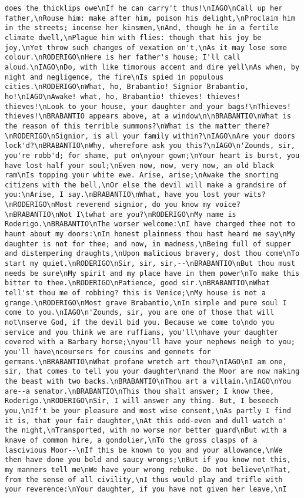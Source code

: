 \begin{verbatim}
does the thicklips owe\nIf he can carry't thus!\nIAGO\nCall up her father,\nRouse him: make after him, poison his delight,\nProclaim him in the streets; incense her kinsmen,\nAnd, though he in a fertile climate dwell,\nPlague him with flies: though that his joy be joy,\nYet throw such changes of vexation on't,\nAs it may lose some colour.\nRODERIGO\nHere is her father's house; I'll call aloud.\nIAGO\nDo, with like timorous accent and dire yell\nAs when, by night and negligence, the fire\nIs spied in populous cities.\nRODERIGO\nWhat, ho, Brabantio! Signior Brabantio, ho!\nIAGO\nAwake! what, ho, Brabantio! thieves! thieves! thieves!\nLook to your house, your daughter and your bags!\nThieves! thieves!\nBRABANTIO appears above, at a window\n\nBRABANTIO\nWhat is the reason of this terrible summons?\nWhat is the matter there?\nRODERIGO\nSignior, is all your family within?\nIAGO\nAre your doors lock'd?\nBRABANTIO\nWhy, wherefore ask you this?\nIAGO\n'Zounds, sir, you're robb'd; for shame, put on\nyour gown;\nYour heart is burst, you have lost half your soul;\nEven now, now, very now, an old black ram\nIs topping your white ewe. Arise, arise;\nAwake the snorting citizens with the bell,\nOr else the devil will make a grandsire of you:\nArise, I say.\nBRABANTIO\nWhat, have you lost your wits?\nRODERIGO\nMost reverend signior, do you know my voice?\nBRABANTIO\nNot I\twhat are you?\nRODERIGO\nMy name is Roderigo.\nBRABANTIO\nThe worser welcome:\nI have charged thee not to haunt about my doors:\nIn honest plainness thou hast heard me say\nMy daughter is not for thee; and now, in madness,\nBeing full of supper and distempering draughts,\nUpon malicious bravery, dost thou come\nTo start my quiet.\nRODERIGO\nSir, sir, sir,--\nBRABANTIO\nBut thou must needs be sure\nMy spirit and my place have in them power\nTo make this bitter to thee.\nRODERIGO\nPatience, good sir.\nBRABANTIO\nWhat tell'st thou me of robbing? this is Venice;\nMy house is not a grange.\nRODERIGO\nMost grave Brabantio,\nIn simple and pure soul I come to you.\nIAGO\n'Zounds, sir, you are one of those that will not\nserve God, if the devil bid you. Because we come to\ndo you service and you think we are ruffians, you'll\nhave your daughter covered with a Barbary horse;\nyou'll have your nephews neigh to you; you'll have\ncoursers for cousins and gennets for germans.\nBRABANTIO\nWhat profane wretch art thou?\nIAGO\nI am one, sir, that comes to tell you your daughter\nand the Moor are now making the beast with two backs.\nBRABANTIO\nThou art a villain.\nIAGO\nYou are--a senator.\nBRABANTIO\nThis thou shalt answer; I know thee, Roderigo.\nRODERIGO\nSir, I will answer any thing. But, I beseech you,\nIf't be your pleasure and most wise consent,\nAs partly I find it is, that your fair daughter,\nAt this odd-even and dull watch o' the night,\nTransported, with no worse nor better guard\nBut with a knave of common hire, a gondolier,\nTo the gross clasps of a lascivious Moor--\nIf this be known to you and your allowance,\nWe then have done you bold and saucy wrongs;\nBut if you know not this, my manners tell me\nWe have your wrong rebuke. Do not believe\nThat, from the sense of all civility,\nI thus would play and trifle with your reverence:\nYour daughter, if you have not given her leave,\nI 
\end{verbatim}
